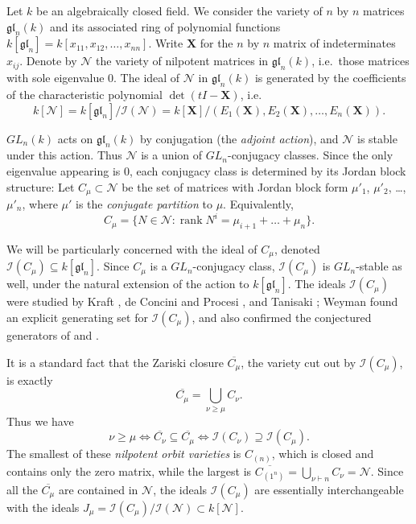 \documentclass[12pt]{article}
\newcommand{\set}[1]{\{#1\}}
\newcommand{\ptn}{\vdash}
\newcommand{\X}{\mathbf{X}}
\newcommand{\I}{{\mathcal{I}}}
\newcommand{\GLn}{{GL}_{n}}
\newcommand{\gln}{{\mathfrak{gl}}_{n}}
\newcommand{\n}{{\mathcal{N}}}
\newcommand{\Cmu}{C_{\mu}}
\newcommand{\closure}[1]{\overline{#1}}
\newcommand{\Cbar}[1]{\closure{C_{#1}}}
\newcommand{\Cmubar}{\Cbar{\mu}}
\newcommand{\Jmu}{J_{\mu}}
\newcommand{\ideal}{\I}
\newcommand{\rank}{\operatorname{rank}}
\numberwithin{equation}{section}
\theoremstyle{plain}
\theoremstyle{definition}
\theoremstyle{remark}
\begin{document}
Let $k$ be an algebraically closed field.  We consider the variety of
$n$ by $n$ matrices $\gln(k)$ and its associated ring of polynomial
functions $k[\gln] = k[x_{11},x_{12},\dots,x_{nn}]$.  Write $\X$ for
the $n$ by $n$ matrix of indeterminates ${x_{ij}}$.  Denote by $\n$
the variety of nilpotent matrices in $\gln(k)$, i.e.\ those matrices
with sole eigenvalue 0.  The ideal of $\n$ in $\gln(k)$ is generated
\cite{Kostant} by the coefficients of the characteristic polynomial
$\det(tI-\X)$, i.e.
\begin{equation}
k[\n]=k[\gln]/\ideal(\n)=k[\X]/(E_{1}(\X),E_{2}(\X),\dots,E_{n}(\X)).
\end{equation}

\label{CmuSubSec}
$\GLn(k)$ acts on $\gln(k)$ by conjugation (the {\em adjoint action}),
and $\n$ is stable under this action.  Thus $\n$ is a union of
$\GLn$-conjugacy classes.  Since the only eigenvalue appearing is 0,
each conjugacy class is determined by
its Jordan block structure: Let $\Cmu\subset\n$ be the set of
matrices with Jordan block form $\mu'_{1}$, $\mu'_{2}$, \dots,
$\mu'_{n}$, where $\mu'$ is the {\em conjugate partition} to $\mu$.
Equivalently,
\begin{equation}
\Cmu=\set{N\in\n:\rank N^{i}=\mu_{i+1}+\dots+\mu_{n}}.
\end{equation}

We will be particularly concerned with the ideal of $\Cmu$, denoted 
$\I(\Cmu) \subseteq k[\gln]$.  
Since $\Cmu$ is a $\GLn$-conjugacy class, $\I(\Cmu)$ is $\GLn$-stable
as well, under the natural extension of the action to $k[\gln]$.  The
ideals $\I(\Cmu)$ were studied by Kraft \cite{Kraft}, de Concini and
Procesi \cite{deConcini&Procesi}, and Tanisaki \cite{Tanisaki}; Weyman
\cite{Weyman} found an explicit generating set for $\I(\Cmu)$, and also
confirmed the conjectured generators of \cite{deConcini&Procesi} and
\cite{Tanisaki}.

It is a standard fact that the Zariski closure $\Cmubar$, the variety
cut out by $\I(\Cmu)$, is exactly
\begin{equation}\label{eq:containCmu}
\Cmubar = \bigcup_{\nu\geq\mu}C_{\nu}.
\end{equation}
Thus we have 
\begin{equation}\label{eq:domCmu}
\nu\geq\mu \iff \Cbar{\nu}\subseteq \Cmubar \iff
\I(C_{\nu})\supseteq \I(\Cmu).
\end{equation}
The smallest of these {\em nilpotent orbit varieties} is
${C_{(n)}}$, which is closed and contains only the zero matrix, while
the largest is
$\Cbar{(1^{n})} = \bigcup_{\nu\ptn n}C_{\nu} = \n$.
Since all the $\Cmubar$ are contained in $\n$, the ideals $\I(\Cmu)$
are essentially interchangeable with the ideals $\Jmu=\I(\Cmu)/\I(\n)
\subset k[\n]$.
\end{document}
